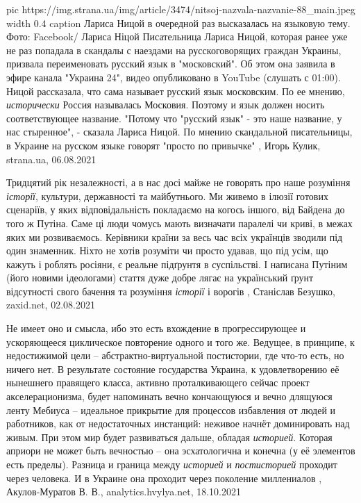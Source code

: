 \ifcmt
  pic https://img.strana.ua/img/article/3474/nitsoj-nazvala-nazvanie-88_main.jpeg
  width 0.4
	caption Лариса Ницой в очередной раз высказалась на языковую тему. Фото: Facebook/ Лариса Ніцой 
\fi
Писательница Лариса Ницой, которая ранее уже не раз попадала в скандалы с
наездами на русскоговорящих граждан Украины, призвала переименовать русский
язык в "московский".  Об этом она заявила в эфире канала "Украина 24", видео
опубликовано в YouTube (слушать с 01:00).  Ницой рассказала, что сама называет
русский язык московским. По ее мнению, \emph{исторически} Россия называлась
Московия. Поэтому и язык должен носить соответствующее название.  "Потому что
"русский язык" - это наше название, у нас стыренное", - сказала Лариса Ницой.
По мнению скандальной писательницы, в Украине на русском языке говорят "просто
по привычке"
, 
Игорь Кулик, strana.ua, 06.08.2021


Тридцятий рік незалежності, а в нас досі майже не говорять про наше розуміння
\emph{історії}, культури, державності та майбутнього. Ми живемо в ілюзії готових
сценаріїв, у яких відповідальність покладаємо на когось іншого, від Байдена до
того ж Путіна. Саме ці люди чомусь мають визначати паралелі чи криві, в межах
яких ми розвиваємось. Керівники країни за весь час всіх українців зводили під один знаменник. Ніхто
не хотів розуміти чи просто удавав, що під усім, що кажуть і роблять росіяни, є
реальне підґрунтя в суспільстві. І написана Путіним (його новими ідеологами)
стаття дуже добре лягає на український ґрунт відсутності свого бачення та
розуміння \emph{історії} і ворогів
, Станіслав Безушко, zaxid.net, 02.08.2021

Не имеет оно и смысла, ибо это есть вхождение в прогрессирующее и ускоряющееся
циклическое повторение одного и того же. Ведущее, в принципе, к недостижимой
цели – абстрактно-виртуальной постистории, где что-то есть, но ничего нет. В
результате состояние государства Украина, к удовлетворению её нынешнего
правящего класса, активно проталкивающего сейчас проект акселерационизма, будет
напоминать вечно кончающуюся и вечно длящуюся ленту Мебиуса – идеальное
прикрытие для процессов избавления от людей и работников, как от недостаточных
инстанций: неживое начнёт доминировать над живым.  При этом мир будет
развиваться дальше, обладая \emph{историей}. Которая априори не может быть вечностью –
она эсхатологична и конечна (у её элементов есть пределы). Разница и граница
между \emph{историей} и \emph{постисторией} проходит через человека. И в Украине она проходит
через поколение миллениалов
, 
Акулов-Муратов В. В., analytics.hvylya.net, 18.10.2021

